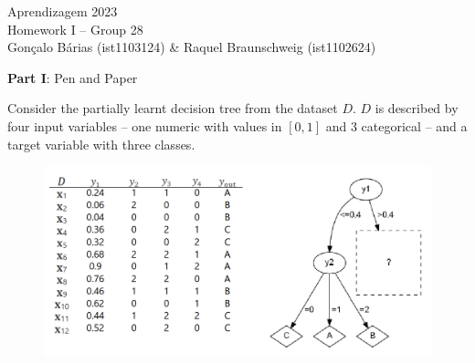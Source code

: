 \documentclass[12pt]{article}
\begin{document}
\begin{center}
  \large{Aprendizagem 2023}\\
  Homework I -- Group 28\\
  \vskip 0.3cm
  Gonçalo Bárias (ist1103124) \& Raquel Braunschweig (ist1102624)\vskip 1cm

  \large{\textbf{Part I}: Pen and Paper}\normalsize
\end{center}

\noindent Consider the partially learnt decision tree from the dataset $D$. $D$ is described by four input variables –
one numeric with values in $[0,1]$ and 3 categorical – and a target variable with three classes.

\begin{figure}[H]
  \centering
  \includegraphics[width=15cm]{./assets/partial_tree_dataset_d}
  \label{fig:PartI-partial-decision-tree-dataset-d}
\end{figure}
\end{document}
